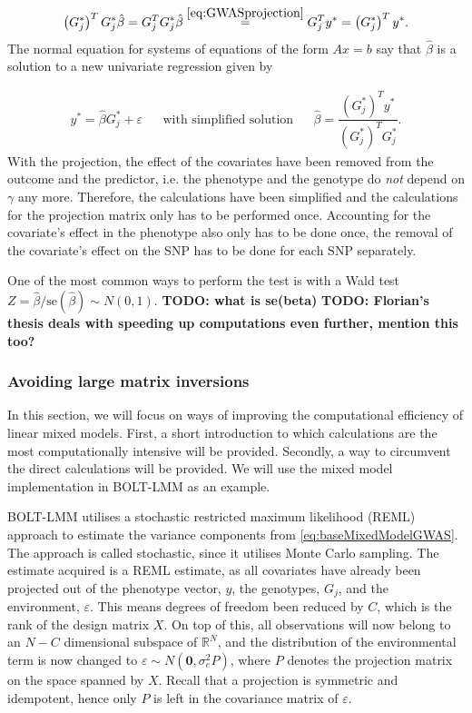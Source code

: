 \begin{equation}
	\left( G_j^{\ast} \right)^T G_j^{\ast} \hat{\beta} = G_j^T G_j^{\ast} \hat{\beta} \stackrel{\ref{eq:GWASprojection}}{=} G_j^T y^{\ast} = \left( G_j^{\ast} \right)^T y^{\ast}.
\end{equation}
The normal equation for systems of equations of the form $ Ax=b $ say that $ \hat{\beta} $ is a solution to a new univariate regression given by

\begin{align}\label{eq:univarGWAS}
	y^\ast = \hat{\beta} G_j^{\ast} + \varepsilon&   &\text{with simplified solution}&  &\hat{\beta} = \dfrac{\left( G_j^{\ast} \right)^T y^{\ast}}{\left( G_j^{\ast} \right)^T G_j^{\ast}}.
\end{align}
With the projection, the effect of the covariates have been removed from the outcome and the predictor, i.e. the phenotype and the 
genotype do \textit{not} depend on $ \gamma $ any more. Therefore, the calculations have been simplified and the calculations for the 
projection matrix only has to be performed once. Accounting for the covariate's effect in the phenotype also only has to be done once, 
the removal of the covariate's effect on the SNP has to be done for each SNP separately.

One of the most common ways to perform the test is with a Wald test $ Z = \hat{\beta}/\text{se}(\hat{\beta}) \sim N(0,1)$. 
\textbf{TODO: what is se(beta)}
\textbf{TODO: Florian's thesis deals with speeding up computations even further, mention this too?}


\subsubsection{Avoiding large matrix inversions}

In this section, we will focus on ways of improving the computational efficiency of linear mixed models. First, a short introduction to which calculations are the most computationally intensive will be provided. Secondly, a way to circumvent the direct calculations will be provided. We will use the mixed model implementation in BOLT-LMM as an example.

BOLT-LMM utilises a stochastic restricted maximum likelihood (REML) approach to estimate the variance components from \cref{eq:baseMixedModelGWAS}. The approach is called stochastic, since it utilises Monte Carlo sampling. The estimate acquired is a REML estimate, as all covariates have already been projected out of the phenotype vector, $ y $, the genotypes, $ G_j $, and the environment, $ \varepsilon $. This means degrees of freedom been reduced by $ C $, which is the rank of the design matrix $ X $. On top of this, all observations will now belong to an $ N-C $ dimensional subspace of $ \mathbb{R}^{N} $, and the distribution of the environmental term is now changed to $ \varepsilon \sim N(\mathbf{0}, \sigma_e^2 P)$, where $ P $ denotes the projection matrix on the space spanned by $ X $. Recall that a projection is symmetric and idempotent, hence only $ P $ is left in the covariance matrix of $ \varepsilon $. 

